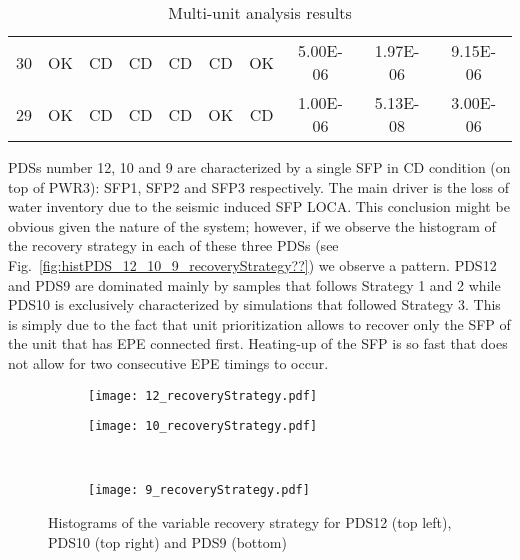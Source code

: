 \begin{table}
\begin{tabular}{c|cccccc|ccc}
     30   & OK   & \cellcolor[gray]{0.95}CD   & \cellcolor[gray]{0.95}CD   & \cellcolor[gray]{0.95}CD   & \cellcolor[gray]{0.95}CD   & OK   & 5.00E-06    & 1.97E-06    & 9.15E-06    \\         
     29   & OK   & \cellcolor[gray]{0.95}CD   & \cellcolor[gray]{0.95}CD   & \cellcolor[gray]{0.95}CD   & OK   & \cellcolor[gray]{0.95}CD   & 1.00E-06    & 5.13E-08    & 3.00E-06    \\    
    \hline
  \end{tabular}
  \caption{Multi-unit analysis results}
  \label{tab:resultsMain}
\end{table}

PDSs number 12, 10 and 9 are characterized by a single SFP in CD condition (on top of PWR3): SFP1, 
SFP2 and SFP3 respectively. The main driver is the loss of water inventory due to the seismic induced
SFP LOCA.
This conclusion might be obvious given the nature of the system; however, if we observe the 
histogram of the recovery strategy in each of these three PDSs 
(see Fig.~\ref{fig:histPDS_12_10_9_recoveryStrategy??}) we observe a pattern.
PDS12 and PDS9 are dominated mainly by samples that follows Strategy 1 and 2 while PDS10 is 
exclusively characterized by simulations that followed Strategy 3.
This is simply due to the fact that unit prioritization allows to recover only the SFP of the unit
that has EPE connected first. Heating-up of the SFP is so fast that does not allow for two consecutive 
EPE timings to occur.

\begin{figure}
  \begin{subfigure}{.5\linewidth}
    \centering
    \texttt{[image: 12\_recoveryStrategy.pdf]}
  \end{subfigure}%
  \begin{subfigure}{.5\linewidth}
    \centering
    \texttt{[image: 10\_recoveryStrategy.pdf]}
  \end{subfigure}\\[1ex]
  \begin{subfigure}{\linewidth}
    \centering
    \texttt{[image: 9\_recoveryStrategy.pdf]}
  \end{subfigure}
  \caption{Histograms of the variable recovery strategy for PDS12 (top left), PDS10 (top right) and PDS9 (bottom)}
  \label{fig:histPDS_12_10_9_recoveryStrategy}
\end{figure}

